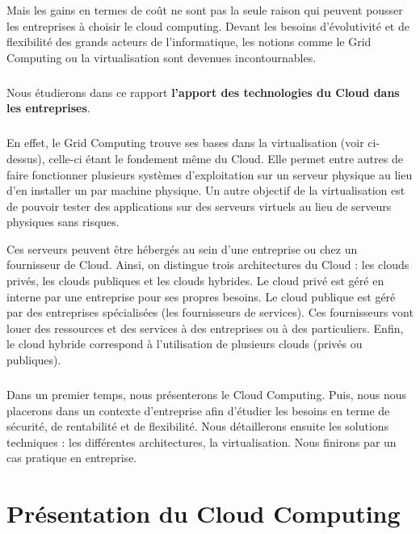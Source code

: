 \documentclass[a4paper,12pt]{report}
\begin{document}
\begin{onehalfspace}
	Mais les gains en termes de coût ne sont pas la seule raison qui peuvent pousser les entreprises à choisir le cloud computing. Devant les besoins d'évolutivité et de flexibilité des grands acteurs de l'informatique, les notions comme le Grid Computing ou la virtualisation sont devenues incontournables.
	
	\paragraph*{}
	Nous étudierons dans ce rapport \textbf{l’apport des technologies du Cloud dans les entreprises}.
	
	\paragraph*{}
	En effet, le Grid Computing trouve ses bases dans la virtualisation (voir ci-dessus), celle-ci étant  le fondement même du Cloud. Elle permet entre autres de faire fonctionner plusieurs systèmes d’exploitation sur un serveur physique au lieu d’en installer un par machine physique. Un autre objectif de la virtualisation est de pouvoir tester des applications sur des serveurs virtuels au lieu de serveurs physiques sans risques.
	
	Ces serveurs peuvent être hébergés au sein d’une entreprise ou chez un fournisseur de Cloud. Ainsi, on distingue trois architectures du Cloud : les clouds privés, les clouds publiques et les clouds hybrides. Le cloud privé est géré en interne par une entreprise pour ses propres besoins. Le cloud publique est géré par des entreprises spécialisées (les fournisseurs de services). Ces fournisseurs vont louer des ressources et des services à des entreprises ou à des particuliers. Enfin, le cloud hybride correspond à l’utilisation de plusieurs clouds (privés ou publiques).
	
	\paragraph*{}
	Dans un premier temps, nous présenterons le Cloud Computing. Puis, nous nous placerons dans un contexte d’entreprise afin d’étudier les besoins en terme de sécurité, de rentabilité et de flexibilité. Nous détaillerons ensuite les solutions techniques : les différentes architectures, la virtualisation. Nous finirons par un cas pratique en entreprise.
	
	
	
	\chapter{Présentation du Cloud Computing}



\end{onehalfspace}
\end{document}
